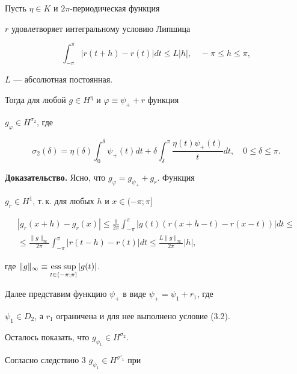 \begin{cor}


Пусть $\eta\in K$ и $2\pi$-периодическая функция


$r$ удовлетворяет интегральному условию Липшица


\begin{equation}


\int_{-\pi}^\pi|r(t+h)-r(t)|dt\le L|h|,\quad -\pi\le h\le\pi,


\end{equation}


$L$ --- абсолютная постоянная.


Тогда для любой $g\in H^\eta$ и $\varphi\equiv\psi_++r$ функция


$g_\varphi\in H^{\sigma_2}$, где


$$


\sigma_2(\delta)=\eta(\delta)\int_0^\delta\psi_+(t)dt+\delta\int_\delta^\pi


\frac{\eta(t)\psi_+(t)}{t}dt,\quad 0\le\delta\le\pi.


$$


\end{cor}





{\bf Доказательство.} Ясно, что $g_\varphi=g_{\psi_+}+g_r$. Функция


$g_r\in H^1$, т.\,к. для любых $h$ и $x\in(-\pi;\pi]$


\begin{multline*}


|g_r(x+h)-g_r(x)|\le\frac{1}{2\pi}


\int_{-\pi}^\pi|g(t)(r(x+h-t)-r(x-t))|dt\le \\


%


\le\frac{\|g\|_\infty}{2\pi}\int_{-\pi}^\pi|r(t-h)-r(t)|dt


\le\frac{L\|g\|_\infty}{2\pi}|h|,


\end{multline*}


где $\|g\|_\infty\equiv \Esssup\limits_{t\in(-\pi;\pi]}|g(t)|$.


Далее представим функцию $\psi_+$ в виде $\psi_+=\psi_1+r_1$, где


$\psi_1\in D_2$, а $r_1$ ограничена и для нее выполнено условие (3.2).


Осталось показать, что $g_{\psi_1}\in H^{\sigma_2}$.


Согласно следствию 3 $g_{\psi_1}\in H^{\sigma'_1}$ при


